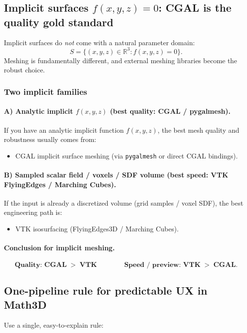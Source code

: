 \documentclass[12pt,a4paper]{article}
\newcommand{\R}{\mathbb{R}}
\theoremstyle{plain}
\theoremstyle{definition}
\begin{document}
	\subsection{Implicit surfaces $f(x,y,z)=0$: CGAL is the quality gold standard}
	Implicit surfaces do \emph{not} come with a natural parameter domain:
	\[
	S=\{(x,y,z)\in\R^3 : f(x,y,z)=0\}.
	\]
	Meshing is fundamentally different, and external meshing libraries become the robust choice.
	
		\subsubsection*{Two implicit families}
	
	\paragraph{A) Analytic implicit $f(x,y,z)$ (best quality: CGAL / pygalmesh).}
	If you have an analytic implicit function $f(x,y,z)$, the best mesh quality and robustness usually comes from:
	\begin{itemize}
		\item CGAL implicit surface meshing (via \texttt{pygalmesh} or direct CGAL bindings).
	\end{itemize}
	
	\paragraph{B) Sampled scalar field / voxels / SDF volume (best speed: VTK FlyingEdges / Marching Cubes).}
	If the input is already a discretized volume (grid samples / voxel SDF), the best engineering path is:
	\begin{itemize}
		\item VTK isosurfacing (FlyingEdges3D / Marching Cubes).
	\end{itemize}
	
	\paragraph{Conclusion for implicit meshing.}
	\[
	\textbf{Quality: CGAL} \;>\; \textbf{VTK}
	\qquad\qquad
	\textbf{Speed / preview: VTK} \;>\; \textbf{CGAL}.
	\]
	
	\subsection{One-pipeline rule for predictable UX in Math3D}
	Use a single, easy-to-explain rule:
	
\end{document}
